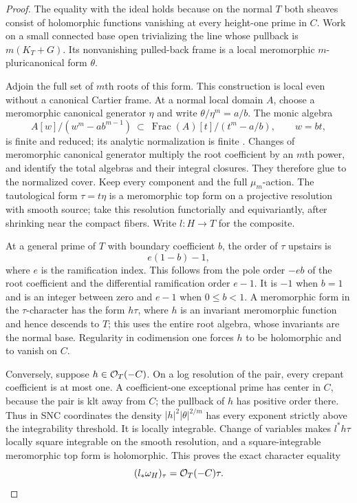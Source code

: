 \begin{proof}
The equality with the ideal holds because on the normal \(T\) both sheaves
consist of holomorphic functions vanishing at every height-one prime in
\(C\).  Work on a small connected base open trivializing the line whose
pullback is \(m(K_T+G)\).  Its nonvanishing pulled-back frame is a local
meromorphic \(m\)-pluricanonical form \(\theta\).

Adjoin the full set of \(m\)th roots of this form.  This construction is
local even without a canonical Cartier frame.  At a normal local domain
\(A\), choose a meromorphic canonical generator \(\eta\) and write
\(\theta/\eta^m=a/b\).  The monic algebra
\[
 A[w]/(w^m-a b^{m-1})\ \subset\
 \operatorname{Frac}(A)[t]/(t^m-a/b),\qquad w=bt,
\]
is finite and reduced; its analytic normalization is finite
\cite[Part~B, Section~4, Corollaries~2--3]{Houzel1961}.  Changes of meromorphic canonical generator multiply
the root coefficient by an \(m\)th power, and identify the total algebras
and their integral closures.  They therefore glue to the normalized cover.
Keep every component and the full \(\mu_m\)-action.  The tautological
form \(\tau=t\eta\) is a meromorphic top form on a projective resolution
with smooth source; take this resolution functorially and equivariantly, after
shrinking near the compact fibers.  Write \(l:H\to T\) for the composite.

At a general prime of \(T\) with boundary coefficient \(b\), the order of
\(\tau\) upstairs is
\begin{equation}\label{eq:canonical-root-order}
 e(1-b)-1,
\end{equation}
where \(e\) is the ramification index.  This follows from the pole order
\(-eb\) of the root coefficient and the differential ramification order
\(e-1\).  It is \(-1\) when \(b=1\) and is an integer between zero and
\(e-1\) when \(0\leq b<1\).  A meromorphic form in the \(\tau\)-character
has the form \(h\tau\), where \(h\) is an invariant meromorphic function
and hence descends to \(T\); this uses the entire root algebra, whose
invariants are the normal base.  Regularity in codimension one forces
\(h\) to be holomorphic and to vanish on \(C\).

Conversely, suppose \(h\in\mathcal O_T(-C)\).  On a log resolution of the pair,
every crepant coefficient is at most one.  A coefficient-one exceptional
prime has center in \(C\), because the pair is klt away from \(C\); the
pullback of \(h\) has positive order there.  Thus in SNC coordinates
the density \(|h|^2|\theta|^{2/m}\) has every exponent strictly above
the integrability threshold.  It is locally integrable.  Change of
variables makes \(l^*h\tau\) locally square integrable on the smooth
resolution, and a square-integrable meromorphic top form is holomorphic.
This proves the exact character equality
\begin{equation}\label{eq:canonical-character}
 (l_*\omega_H)_{\tau}=\mathcal O_T(-C)\tau.
\end{equation}


\end{proof}
